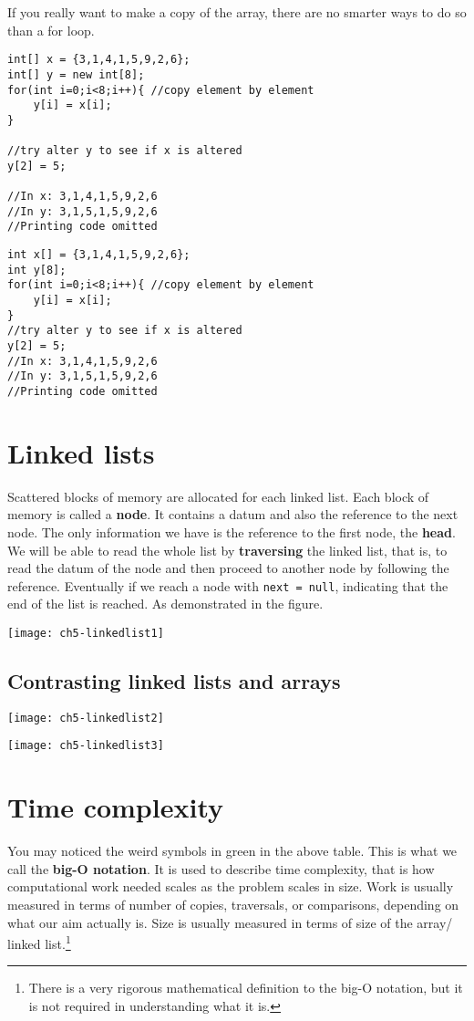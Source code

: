 \if{}
If you really want to make a copy of the array, there are no smarter ways to do so than a for loop.

\begin{lstlisting}
int[] x = {3,1,4,1,5,9,2,6};
int[] y = new int[8]; 
for(int i=0;i<8;i++){ //copy element by element
    y[i] = x[i];
}

//try alter y to see if x is altered
y[2] = 5; 

//In x: 3,1,4,1,5,9,2,6
//In y: 3,1,5,1,5,9,2,6
//Printing code omitted
\end{lstlisting}
\else
\begin{lstlisting}
int x[] = {3,1,4,1,5,9,2,6};
int y[8];
for(int i=0;i<8;i++){ //copy element by element
    y[i] = x[i];
}
//try alter y to see if x is altered
y[2] = 5;
//In x: 3,1,4,1,5,9,2,6
//In y: 3,1,5,1,5,9,2,6
//Printing code omitted
\end{lstlisting}
\fi

\section{Linked lists}

Scattered blocks of memory are allocated for each linked list. Each block of memory is called a \textbf{node}. It contains a datum and also the reference to the next node. The only information we have is the reference to the first node, the \textbf{head}. We will be able to read the whole list by \textbf{traversing} the linked list, that is, to read the datum of the node and then proceed to another node by following the reference. Eventually if we reach a node with \texttt{next = null}, indicating that the end of the list is reached. As demonstrated in the figure.

\texttt{[image: ch5-linkedlist1]}

\subsection{Contrasting linked lists and arrays}

\texttt{[image: ch5-linkedlist2]}

\texttt{[image: ch5-linkedlist3]}

\section{Time complexity}
\label{sec:bigO}
You may noticed the weird symbols in green in the above table. This is what we call the \textbf{big-O notation}. It is used to describe time complexity, that is how computational work needed scales as the problem scales in size. Work is usually measured in terms of number of copies, traversals, or comparisons, depending on what our aim actually is. Size is usually measured in terms of size of the array/ linked list.\footnote{There is a very rigorous mathematical definition to the big-O notation, but it is not required in understanding what it is.}

